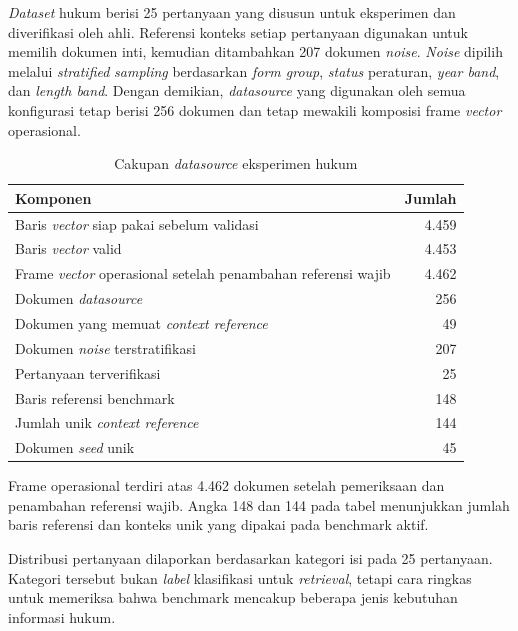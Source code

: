 \emph{Dataset} hukum berisi 25 pertanyaan yang disusun untuk eksperimen dan diverifikasi oleh ahli.
Referensi konteks setiap pertanyaan digunakan untuk memilih dokumen inti, kemudian ditambahkan
207 dokumen \emph{noise}.
\emph{Noise} dipilih melalui \emph{stratified} \emph{sampling} berdasarkan \emph{form group}, \emph{status}
peraturan, \emph{year band}, dan \emph{length band}. Dengan demikian, \emph{datasource} yang
digunakan oleh semua konfigurasi tetap berisi 256 dokumen dan tetap mewakili komposisi
frame \emph{vector} operasional.

\begin{table}[H]\centering\scriptsize
\caption{Cakupan \emph{datasource} eksperimen hukum}
\label{tab:legal-revision-dataset-updated}
\begin{tabularx}{\textwidth}{@{}>{\RaggedRight\arraybackslash}Xr@{}}
\toprule\textbf{Komponen} & \textbf{Jumlah}\\\midrule
Baris \emph{vector} siap pakai sebelum validasi & 4.459\\
Baris \emph{vector} valid & 4.453\\
Frame \emph{vector} operasional setelah penambahan referensi wajib & 4.462\\
Dokumen \emph{datasource} & 256\\
Dokumen yang memuat \emph{context reference} & 49\\
Dokumen \emph{noise} terstratifikasi & 207\\
Pertanyaan terverifikasi & 25\\
Baris referensi benchmark & 148\\
Jumlah unik \emph{context reference} & 144\\
Dokumen \emph{seed} unik & 45\\
\bottomrule\end{tabularx}
\end{table}

Frame operasional terdiri atas 4.462 dokumen setelah pemeriksaan dan penambahan
referensi wajib. Angka 148 dan 144 pada tabel menunjukkan jumlah baris referensi dan
konteks unik yang dipakai pada benchmark aktif.

Distribusi pertanyaan dilaporkan berdasarkan kategori isi pada 25
pertanyaan. Kategori tersebut bukan \emph{label} klasifikasi untuk \emph{retrieval}, tetapi
cara ringkas untuk memeriksa bahwa benchmark mencakup beberapa jenis kebutuhan
informasi hukum.

